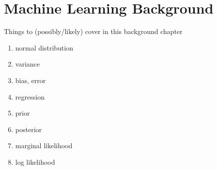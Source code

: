 \chapter{Machine Learning Background} \label{chap:ml}

Things to (possibly/likely) cover in this background chapter
\begin{enumerate}
    \item normal distribution
    \item variance
    \item bias, error
    \item regression
    \item prior
    \item posterior
    \item marginal likelihood
    \item log likelihood
\end{enumerate}
